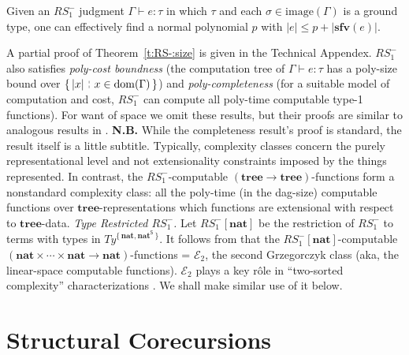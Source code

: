 \documentclass[envcountsame]{llncs}
\newcommand{\sfv}{\ensuremath{\mathbf{sfv}}}\newcommand{\ssize}[1]{\Vert #1\Vert}
\newcommand{\safe}[1]{#1^{\mathsf{S}}}
\newcommand{\type}[1]{\ensuremath{\mathbf{#1}}\xspace}
\newcommand{\Nat}{\type{nat}}
\newcommand{\Tree}{\type{tree}}
\newcommand{\Ty}{\mathit{Ty}}
\newcommand{\asize}[1]{\ensuremath{\mathopen{|}#1\mathclose{|}}\xspace}
\newcommand{\RSmi}{\mathit{RS^-_1}}
\newcommand{\dom}{\mathrm{dom}}
\newcommand{\image}{\mathrm{image}}
\newcommand{\set}[1]{\{\,#1\,\}}
\newcommand{\entails}{\vdash}
\newcommand{\suchthat}{\mathrel{\,\stackrel{\rule{0.03em}{0.5ex}}{\rule[-.1ex]{0.03em}{0.5ex}}\,}}
\newcommand{\of}{\colon}
\renewcommand{\colon}{\mathpunct{:}}
\begin{document}
\begin{theorem}[$\RSmi$ Poly-Heap Size-Boundness] \label{t:RS-:size} 
  Given an $\RSmi$ judgment $\Gamma\entails e\of \tau$  in which
  $\tau$ and each $\sigma\in\image(\Gamma)$ is a ground type, one can
  effectively find a normal polynomial $p$ with
$\asize{e} \leq p + \asize{\sfv(e)}$.
\end{theorem}

A partial proof of Theorem~\ref{t:RS-:size} is given in the Technical 
Appendex.
$\RSmi$ also satisfies \emph{poly-cost boundness} (the computation
tree of $\Gamma\entails e\of \tau$ has a poly-size bound over
$\set{|x|\suchthat x\in\dom(\Gamma)}$) and 
\emph{poly-completeness} (for a suitable model of
computation and cost, $\RSmi$ can compute all poly-time computable
type-1 functions).  For want of space we omit these results, but
their proofs are similar to analogous
results in \cite{DR:ATS:LMCS,DannerRoyer:2algs}.
\textbf{N.B.}  While the 
completeness result's proof is standard, the result itself is a
little subtitle.  Typically, complexity classes concern the purely
representational level and not extensionality constraints imposed by
the things represented.  In contrast, the $\RSmi$-computable
$(\Tree\to\Tree)$-functions form a nonstandard complexity class: all
the poly-time (in the dag-size) computable functions over
$\Tree$-representations which functions are  extensional with
respect to $\Tree$-data.  
\emph{Type Restricted $\RSmi$.}  
Let $\RSmi[\Nat]$ be the restriction of $\RSmi$ to terms with types
in $\Ty^{\set{\Nat,\safe\Nat}}\!$.
It follows from \cite{bellantoni:thesis,Leivant:FM2} 
that the $\RSmi[\Nat]$-computable
$(\Nat\times\cdots\times\Nat\to\Nat)$-functions = $\mathcal{E}_2$,
the second Grzegorczyk class (aka, the linear-space computable
functions).  $\mathcal{E}_2$ plays a key r\^{o}le in ``two-sorted
complexity'' characterizations \cite[Chapter 4]{CookNguyen:book}.  We shall
make similar use of it below.












\section{Structural Corecursions}\label{S:codata}
\end{document}
